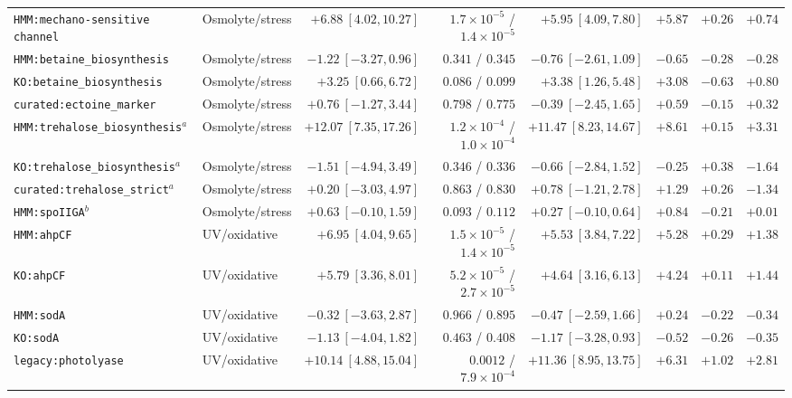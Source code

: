 \begin{table}[htbp]
\begin{tabular}{>{\raggedright\arraybackslash}p{2.9cm}lrrrrrr}
\texttt{HMM:mechano-\allowbreak sensitive channel} & Osmolyte/stress & $+6.88\ [4.02,10.27]$ & $1.7\times 10^{-5}$ / $1.4\times 10^{-5}$ & $+5.95\ [4.09,7.80]$ & $+5.87$ & $+0.26$ & $+0.74$\\
\texttt{HMM:betaine\_\allowbreak biosynthesis} & Osmolyte/stress & $-1.22\ [-3.27,0.96]$ & $0.341$ / $0.345$ & $-0.76\ [-2.61,1.09]$ & $-0.65$ & $-0.28$ & $-0.28$\\
\texttt{KO:betaine\_\allowbreak biosynthesis} & Osmolyte/stress & $+3.25\ [0.66,6.72]$ & $0.086$ / $0.099$ & $+3.38\ [1.26,5.48]$ & $+3.08$ & $-0.63$ & $+0.80$\\
\texttt{curated:\allowbreak ectoine\_\allowbreak marker} & Osmolyte/stress & $+0.76\ [-1.27,3.44]$ & $0.798$ / $0.775$ & $-0.39\ [-2.45,1.65]$ & $+0.59$ & $-0.15$ & $+0.32$\\
\texttt{HMM:trehalose\_\allowbreak biosynthesis}$^a$ & Osmolyte/stress & $+12.07\ [7.35,17.26]$ & $1.2\times 10^{-4}$ / $1.0\times 10^{-4}$ & $+11.47\ [8.23,14.67]$ & $+8.61$ & $+0.15$ & $+3.31$\\
\texttt{KO:trehalose\_\allowbreak biosynthesis}$^a$ & Osmolyte/stress & $-1.51\ [-4.94,3.49]$ & $0.346$ / $0.336$ & $-0.66\ [-2.84,1.52]$ & $-0.25$ & $+0.38$ & $-1.64$\\
\texttt{curated:\allowbreak trehalose\_\allowbreak strict}$^a$ & Osmolyte/stress & $+0.20\ [-3.03,4.97]$ & $0.863$ / $0.830$ & $+0.78\ [-1.21,2.78]$ & $+1.29$ & $+0.26$ & $-1.34$\\
\texttt{HMM:spoIIGA}$^b$ & Osmolyte/stress & $+0.63\ [-0.10,1.59]$ & $0.093$ / $0.112$ & $+0.27\ [-0.10,0.64]$ & $+0.84$ & $-0.21$ & $+0.01$\\
\texttt{HMM:ahpCF} & UV/oxidative & $+6.95\ [4.04,9.65]$ & $1.5\times 10^{-5}$ / $1.4\times 10^{-5}$ & $+5.53\ [3.84,7.22]$ & $+5.28$ & $+0.29$ & $+1.38$\\
\texttt{KO:ahpCF} & UV/oxidative & $+5.79\ [3.36,8.01]$ & $5.2\times 10^{-5}$ / $2.7\times 10^{-5}$ & $+4.64\ [3.16,6.13]$ & $+4.24$ & $+0.11$ & $+1.44$\\
\texttt{HMM:sodA} & UV/oxidative & $-0.32\ [-3.63,2.87]$ & $0.966$ / $0.895$ & $-0.47\ [-2.59,1.66]$ & $+0.24$ & $-0.22$ & $-0.34$\\
\texttt{KO:sodA} & UV/oxidative & $-1.13\ [-4.04,1.82]$ & $0.463$ / $0.408$ & $-1.17\ [-3.28,0.93]$ & $-0.52$ & $-0.26$ & $-0.35$\\
\texttt{legacy:photolyase} & UV/oxidative & $+10.14\ [4.88,15.04]$ & $0.0012$ / $7.9\times 10^{-4}$ & $+11.36\ [8.95,13.75]$ & $+6.31$ & $+1.02$ & $+2.81$\\

\end{tabular}
\end{table}

